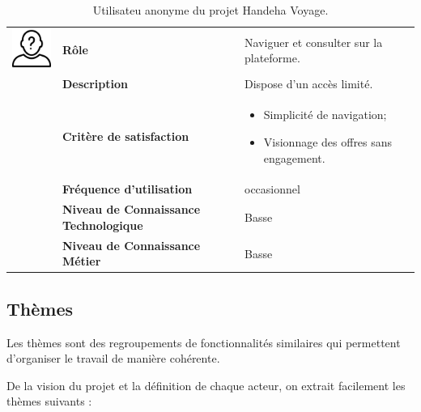 \documentclass[12pt]{report}
\begin{document}
				\begin{table}[h]
				  \centering
				  \caption{Utilisateu anonyme du projet Handeha Voyage.}
				  \label{tab:Anon}
				    \begin{tabular}{|p{3cm}|p{4cm}|p{7cm}|}
					\hline
					\begin{minipage}{3cm}
						\includegraphics[width=2cm]{anonyme.png}
					\end{minipage} & \textbf{Rôle} & Naviguer et consulter sur la plateforme.\\ \cline{2-3}
							& \textbf{Description} & Dispose d’un accès limité.\\ \cline{2-3}
							& \textbf{Critère de satisfaction}& \begin{itemize}
														\item Simplicité de navigation;
														\item Visionnage des offres sans engagement.
													\end{itemize}\\ \cline{2-3}
							&\textbf{Fréquence d’utilisation} & occasionnel \\  \cline{2-3}
							&\textbf{Niveau de Connaissance Technologique} & Basse \\  \cline{2-3}
							&\textbf{Niveau de Connaissance Métier} & Basse \\ 
					\hline
				    \end{tabular}
				\end{table}
				\FloatBarrier				


				\subsection{Thèmes}
				
				\hspace{15pt} Les thèmes sont des regroupements de fonctionnalités similaires qui permettent d'organiser le travail de manière cohérente. 
				
				De la vision du projet et la définition de chaque acteur, on extrait facilement les thèmes suivants :
				
\end{document}
